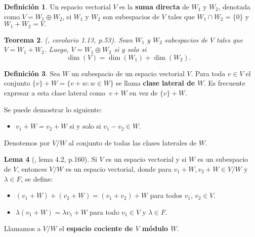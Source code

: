 \documentclass[12pt]{book}
\newtheorem{theorem}{Teorema}[section]
\theoremstyle{definition}
\newtheorem{definition}[theorem]{Definición}
\newtheorem{lemma}[theorem]{Lema}
\newcounter{in}
\newcounter{ini}
\begin{document}
\begin{definition}
  \label{suma-directa}
  Un espacio vectorial $V$ es la \textbf{suma directa} de $W_{1}$ y
  $W_{2}$, denotada como $V=W_{1}\oplus W_{2}$, si $W_{1}$ y $W_{2}$
  son subespacios de $V$ tales que $W_{1}\cap W_{2}=\{0\}$ y
  $W_{1}+W_{2}=V.$ 
\end{definition}


\begin{theorem}{\normalfont (\cite{friedberg1982algebra}, corolario 1.13, p.53)}. 
  Sean $W_{1}$ y $W_{2}$ subespacios de $V$ tales que
  $V=W_{1}+W_{2}$. Luego, $V=W_{1}\oplus W_{2}$ si y solo si 
  $$\dim(V)=\dim(W_{1})+\dim(W_{2}).$$
\end{theorem}

\begin{definition}
  Sea $W$ un subespacio de un espacio vectorial $V$. Para toda $v\in V$ el conjunto $\{v\}+W=\{v+w:w\in W\}$ se
  llama \textbf{clase lateral de $W$}. Es frecuente
  expresar a esta clase lateral como~$v+W$ en vez de $\{v\}+W$. 
\end{definition}

Se puede demostrar lo siguiente:
\begin{itemize}
\item $v_{1}+W=v_{2}+W$ si y solo si $v_{1}-v_{2}\in W.$
\end{itemize}
Denotemos por $V/W$ al conjunto de todas las clases laterales de $W$.
\begin{lemma}[\cite{herstein1990algebra}, lema 4.2, p.160]
  \label{esp-coc}
  Si $V$ es un espacio vectorial y si $W$ es un subespacio de $V$,
  entonces $V/W$ es un espacio vectorial, donde para $v_{1}+W,v_{2}+W\in V/W$ y
  $\lambda\in F$, se define:
  \begin{itemize}
  \item $(v_{1}+W)+(v_{2}+W)=(v_{1}+v_{2})+W$ para todos $v_{1}$, $v_{2}\in V$.
  \item $\lambda(v_{1}+W)=\lambda v_{1}+W$ para todo $v_{1}\in V$ y $\lambda\in F$.
  \end{itemize}
  Llamamos a $V/W$ el \textbf{espacio cociente de $V$ módulo $W$}.
\end{lemma}
\end{document}
